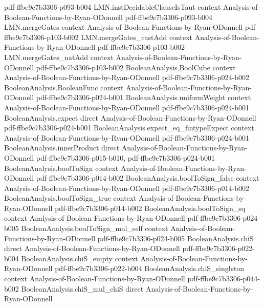 \begin{lemma}
  {pdf-ffbe9c7b3306-p093-b004}
\proofstep
  {LMN.instDecidableClauseIsTaut}
  {context}
  {Analysis-of-Boolean-Functions-by-Ryan-ODonnell}
  {pdf-ffbe9c7b3306-p093-b004}
\proofstep
  {LMN.mergeGates}
  {context}
  {Analysis-of-Boolean-Functions-by-Ryan-ODonnell}
  {pdf-ffbe9c7b3306-p103-b002}
\proofstep
  {LMN.mergeGates_castAdd}
  {context}
  {Analysis-of-Boolean-Functions-by-Ryan-ODonnell}
  {pdf-ffbe9c7b3306-p103-b002}
\proofstep
  {LMN.mergeGates_natAdd}
  {context}
  {Analysis-of-Boolean-Functions-by-Ryan-ODonnell}
  {pdf-ffbe9c7b3306-p103-b002}
\proofstep
  {BooleanAnalysis.BoolCube}
  {context}
  {Analysis-of-Boolean-Functions-by-Ryan-ODonnell}
  {pdf-ffbe9c7b3306-p024-b002}
\proofstep
  {BooleanAnalysis.BooleanFunc}
  {context}
  {Analysis-of-Boolean-Functions-by-Ryan-ODonnell}
  {pdf-ffbe9c7b3306-p024-b001}
\proofstep
  {BooleanAnalysis.uniformWeight}
  {context}
  {Analysis-of-Boolean-Functions-by-Ryan-ODonnell}
  {pdf-ffbe9c7b3306-p024-b001}
\proofstep
  {BooleanAnalysis.expect}
  {direct}
  {Analysis-of-Boolean-Functions-by-Ryan-ODonnell}
  {pdf-ffbe9c7b3306-p024-b001}
\proofstep
  {BooleanAnalysis.expect_eq_fintypeExpect}
  {context}
  {Analysis-of-Boolean-Functions-by-Ryan-ODonnell}
  {pdf-ffbe9c7b3306-p024-b001}
\proofstep
  {BooleanAnalysis.innerProduct}
  {direct}
  {Analysis-of-Boolean-Functions-by-Ryan-ODonnell}
  {pdf-ffbe9c7b3306-p015-b010,
    pdf-ffbe9c7b3306-p024-b001}
\proofstep
  {BooleanAnalysis.boolToSign}
  {context}
  {Analysis-of-Boolean-Functions-by-Ryan-ODonnell}
  {pdf-ffbe9c7b3306-p014-b002}
\proofstep
  {BooleanAnalysis.boolToSign_false}
  {context}
  {Analysis-of-Boolean-Functions-by-Ryan-ODonnell}
  {pdf-ffbe9c7b3306-p014-b002}
\proofstep
  {BooleanAnalysis.boolToSign_true}
  {context}
  {Analysis-of-Boolean-Functions-by-Ryan-ODonnell}
  {pdf-ffbe9c7b3306-p014-b002}
\proofstep
  {BooleanAnalysis.boolToSign_sq}
  {context}
  {Analysis-of-Boolean-Functions-by-Ryan-ODonnell}
  {pdf-ffbe9c7b3306-p024-b005}
\proofstep
  {BooleanAnalysis.boolToSign_mul_self}
  {context}
  {Analysis-of-Boolean-Functions-by-Ryan-ODonnell}
  {pdf-ffbe9c7b3306-p024-b005}
\proofstep
  {BooleanAnalysis.chiS}
  {direct}
  {Analysis-of-Boolean-Functions-by-Ryan-ODonnell}
  {pdf-ffbe9c7b3306-p022-b004}
\proofstep
  {BooleanAnalysis.chiS_empty}
  {context}
  {Analysis-of-Boolean-Functions-by-Ryan-ODonnell}
  {pdf-ffbe9c7b3306-p022-b004}
\proofstep
  {BooleanAnalysis.chiS_singleton}
  {context}
  {Analysis-of-Boolean-Functions-by-Ryan-ODonnell}
  {pdf-ffbe9c7b3306-p044-b002}
\proofstep
  {BooleanAnalysis.chiS_mul_chiS}
  {direct}
  {Analysis-of-Boolean-Functions-by-Ryan-ODonnell}

\end{lemma}
